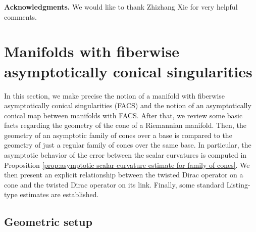 \documentclass[12pt, reqno]{amsart}
\theoremstyle{plain} %
\theoremstyle{definition}
\theoremstyle{remark}
\numberwithin{equation}{section}
\begin{document}
\vspace{.5cm}
\textbf{Acknowledgments.} We would like to thank Zhizhang Xie for very helpful comments.

\section{Manifolds with fiberwise asymptotically conical singularities}\label{sec:manifolds with facs}
In this section, we make precise the notion of a manifold with fiberwise asymptotically conical singularities (FACS)
and the notion of an asymptotically conical map between manifolds with FACS.
After that, we review some basic facts regarding the geometry of the cone of a Riemannian manifold.
Then, the geometry of an asymptotic family of cones over a base is compared to the geometry of just a regular family of cones over the same base.
In particular, the asymptotic behavior of the error between the scalar curvatures is computed in Proposition \ref{prop:asymptotic scalar curvature estimate for family of cones}.
We then present an explicit relationship between the twisted Dirac operator on a cone and the twisted Dirac operator on its link.
Finally, some standard Listing-type estimates are established.

\subsection{Geometric setup} 
\end{document}
